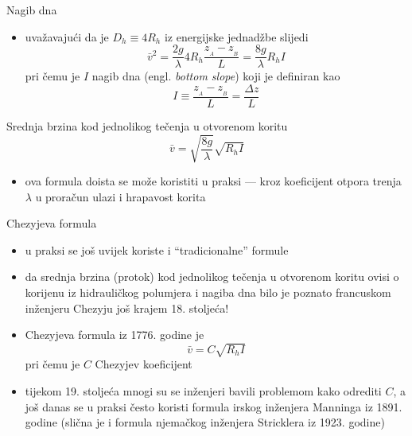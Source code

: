 \documentclass[croatian]{beamer}
\begin{document}
\begin{frame}{Nagib dna}

\begin{itemize}
\item uvažavajući da je $D_{h}\equiv4R_{h}$ iz energijske jednadžbe slijedi
\[
\bar{v}^{2}=\frac{2g}{\lambda}4R_{h}\frac{z_{_{A}}-z_{_{B}}}{L}=\frac{8g}{\lambda}R_{h}I
\]
pri čemu je $I$ \alert{nagib dna} (engl. \emph{bottom slope}) koji
je definiran kao
\[
I\equiv\frac{z_{_{A}}-z_{_{B}}}{L}=\frac{\Delta z}{L}
\]
\end{itemize}
\begin{block}{Srednja brzina kod jednolikog tečenja u otvorenom koritu}
\[
\bar{v}=\sqrt{\frac{8g}{\lambda}}\sqrt{R_{h}I}
\]
\end{block}
\begin{itemize}
\item ova formula doista se može koristiti u praksi --- kroz koeficijent
otpora trenja $\lambda$ u proračun ulazi i hrapavost korita
\end{itemize}
\end{frame}

\begin{frame}{Chezyjeva formula}

\begin{itemize}
\item u praksi se još uvijek koriste i ``tradicionalne'' formule
\item da srednja brzina (protok) kod jednolikog tečenja u otvorenom koritu
ovisi o korijenu iz hidrauličkog polumjera i nagiba dna bilo je poznato
francuskom inženjeru Chezyju još krajem 18. stoljeća!
\item \alert{Chezyjeva formula} iz 1776. godine je
\[
\bar{v}=C\sqrt{R_{h}I}
\]
pri čemu je $C$ Chezyjev koeficijent
\item tijekom 19. stoljeća mnogi su se inženjeri bavili problemom kako odrediti
$C$, a još danas se u praksi često koristi formula irskog inženjera
Manninga iz 1891. godine (slična je i formula njemačkog inženjera
Stricklera iz 1923. godine)
\end{itemize}
\end{frame}
\end{document}
